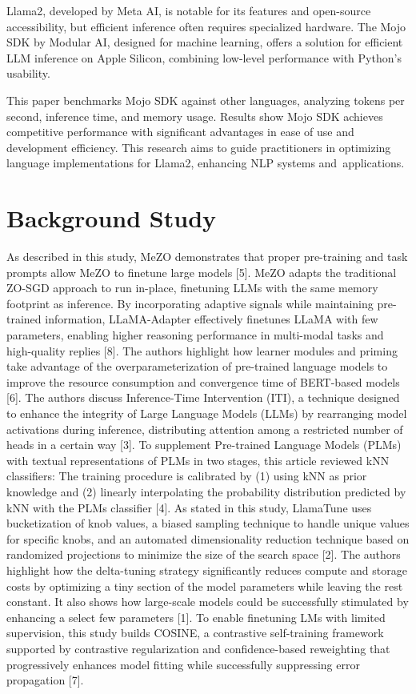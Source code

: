 \documentclass[conference]{IEEEtran}
\begin{document}
Llama2, developed by Meta AI, is notable for its features and open-source accessibility, but efficient inference often requires specialized hardware. The Mojo SDK by Modular AI, designed for machine learning, offers a solution for efficient LLM inference on Apple Silicon, combining low-level performance with Python's usability.

This paper benchmarks Mojo SDK against other languages, analyzing tokens per second, inference time, and memory usage. Results show Mojo SDK achieves competitive performance with significant advantages in ease of use and development efficiency. This research aims to guide practitioners in optimizing language implementations for Llama2, enhancing NLP systems and applications.


\section{Background Study}
As described in this study, MeZO demonstrates that proper pre-training and task prompts allow MeZO to finetune large models [5]. MeZO adapts the traditional ZO-SGD approach to run in-place, finetuning LLMs with the same memory footprint as inference. By incorporating adaptive signals while maintaining pre-trained information, LLaMA-Adapter effectively finetunes LLaMA with few parameters, enabling higher reasoning performance in multi-modal tasks and high-quality replies [8]. The authors highlight how learner modules and priming take advantage of the overparameterization of pre-trained language models to improve the resource consumption and convergence time of BERT-based models [6]. The authors discuss Inference-Time Intervention (ITI), a technique designed to enhance the integrity of Large Language Models (LLMs) by rearranging model activations during inference, distributing attention among a restricted number of heads in a certain way [3]. To supplement Pre-trained Language Models (PLMs) with textual representations of PLMs in two stages, this article reviewed kNN classifiers: The training procedure is calibrated by (1) using kNN as prior knowledge and (2) linearly interpolating the probability distribution predicted by kNN with the PLMs classifier [4]. As stated in this study, LlamaTune uses bucketization of knob values, a biased sampling technique to handle unique values for specific knobs, and an automated dimensionality reduction technique based on randomized projections to minimize the size of the search space [2]. The authors highlight how the delta-tuning strategy significantly reduces compute and storage costs by optimizing a tiny section of the model parameters while leaving the rest constant. It also shows how large-scale models could be successfully stimulated by enhancing a select few parameters [1]. To enable finetuning LMs with limited supervision, this study builds COSINE, a contrastive self-training framework supported by contrastive regularization and confidence-based reweighting that progressively enhances model fitting while successfully suppressing error propagation [7].
\end{document}
